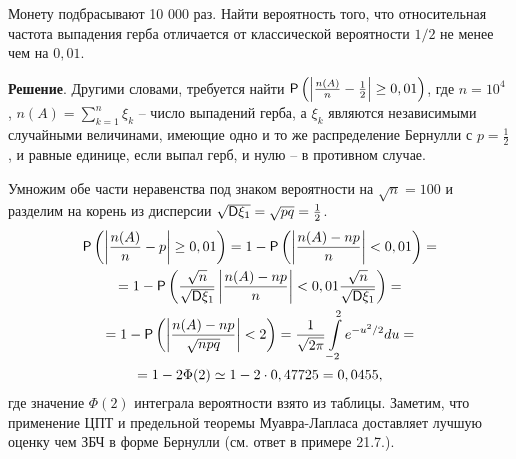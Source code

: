 \begin{example}[Ср. пример 21.7]
Монету подбрасывают 10 000 раз. Найти вероятность того, что относительная частота выпадения герба отличается от классической вероятности $1/2$ не менее чем на $0,01$.


\textbf{Решение}. Другими словами, требуется найти $\P\left(\left|\frac{n(A)}{n}-\frac{1}{2}\right|\geq0,01\right)$, где $n = 10^4$ , $n(A) =
\sum\limits_{k=1}^n \xi_k$ -- число выпадений герба, а $\xi_k$ являются независимыми случайными величинами, имеющие одно и то же распределение
Бернулли с $p = \frac{1}{2}$, и равные единице, если выпал герб, и нулю -- в противном случае. 

Умножим обе части неравенства под знаком вероятности на $\sqrt{n} = 100$ и разделим на корень из дисперсии $\sqrt{\D\xi_1} = \sqrt{pq} = \frac{1}{2}$.
\begin{gather*}
	\P\left(
		\left|
			\frac{n(A)}{n}-p
		\right|\geq0,01
	\right)=
	1-\P\left(
		\left|
			\frac{n(A)-np}{n}
		\right|<0,01
	\right)=\\=
	1-\P\left(
		\frac{\sqrt{n}}{\sqrt{\D\xi_1}}
		\left|
			\frac{n(A)-np}{n}
		\right|<0,01\frac{\sqrt{n}}{\sqrt{\D\xi_1}}
	\right)=\\=
	1-\P\left(
		\left|
			\frac{n(A)-np}{\sqrt{npq}}
		\right|<2
	\right)=
	\frac{1}{\sqrt{2\pi}}\int\limits_{-2}^2 e^{-u^2/2} du=\\=
	1-2\Phi(2)\simeq 1 - 2 \cdot 0,47725 = 0,0455,
\end{gather*}
где значение $\Phi(2)$ интеграла вероятности взято из таблицы. Заметим,
что применение ЦПТ и предельной теоремы Муавра-Лапласа доставляет
лучшую оценку чем ЗБЧ в форме Бернулли (см. ответ в примере 21.7.).

\end{example}
